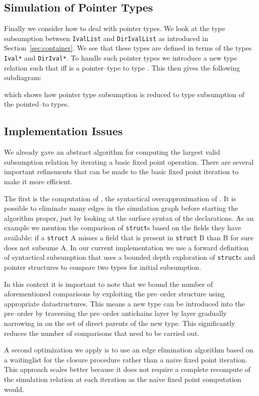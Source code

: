 \documentclass{sigplanconf}
\begin{document}
\subsection{Simulation of Pointer Types}

Finally we consider how to deal with pointer types. We look at the
type subsumption between \verb+IvalList+ and \verb+DirIvalList+ as
introduced in Section~\ref{sec:container}. We see that these types are
defined in terms of the types \verb+Ival*+ and \verb+DirIval*+. To
handle such pointer types we introduce a new type relation  such
that  iff  is a pointer--type to type . This
then gives the following subdiagram:

which shows how pointer type subsumption is reduced to type
subsumption of the pointed--to types.

\subsection{Implementation Issues}

We already gave an abstract algorithm for
computing the largest valid subsumption relation by iterating a basic
fixed point operation. 
There are several important refinements that can be made to the basic
fixed point iteration to make it more efficient. 

The first is the computation of , the syntactical
overapproximation of . It is possible to eliminate many edges
in the simulation graph before starting the algorithm proper, just by
looking at the surface syntax of the declarations. As an example we
mention the comparison of \verb+struct+s based on the fields they have
available: if a \verb+struct+ A misses a field that is present in
\verb+struct+ B than B for sure does not subsume A. In our current
implementation we use a forward definition of syntactical subsumption
that uses a bounded depth exploration of \verb+struct+s and pointer
structures to compare two types for initial subsumption.

In this context it is important to note that we bound the number of
aforementioned comparisons by exploiting the pre--order structure
using appropriate datastructures. This means a new type can be
introduced into the pre--order by traversing the pre--order antichains
layer by layer gradually narrowing in on the set of direct parents of
the new type. This significantly reduces the number of comparisons
that need to be carried out.

A second optimization we apply is to use an edge elimination
algorithm based on a waitinglist for the closure procedure rather than
a naive fixed point iteration. This approach scales better because it
does not require a complete recompute of the simulation relation at
each iteration as the naive fixed point computation would.
\end{document}
